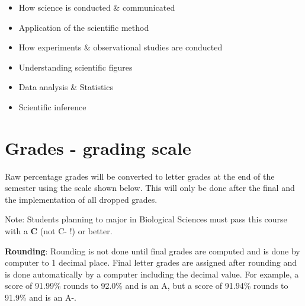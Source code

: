 \documentclass[
]{book}
\providecommand{\tightlist}{%
  \setlength{\itemsep}{0pt}\setlength{\parskip}{0pt}}
\begin{document}
\begin{itemize}
\tightlist
\item
  How science is conducted \& communicated
\item
  Application of the scientific method
\item
  How experiments \& observational studies are conducted
\item
  Understanding scientific figures
\item
  Data analysis \& Statistics
\item
  Scientific inference
\end{itemize}

\hypertarget{grades---grading-scale}{%
\chapter{Grades - grading scale}\label{grades---grading-scale}}

Raw percentage grades will be converted to letter grades at the end of the semester using the scale shown below. This will only be done after the final and the implementation of all dropped grades.

Note: Students planning to major in Biological Sciences must pass this course with a \textbf{C} (not C- !) or better.

\textbf{Rounding}: Rounding is not done until final grades are computed and is done by computer to 1 decimal place. Final letter grades are assigned after rounding and is done automatically by a computer including the decimal value. For example, a score of 91.99\% rounds to 92.0\% and is an A, but a score of 91.94\% rounds to 91.9\% and is an A-.
\end{document}
